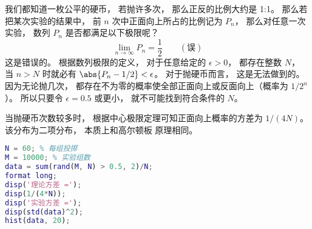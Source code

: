 
\begin{issues}
\issueDraft
\end{issues}


我们都知道一枚公平的硬币， 若抛许多次， 那么正反的比例大约是 1:1。 那么若把某次实验的结果中， 前 $n$ 次中正面向上所占的比例记为 $P_n$， 那么对任意一次实验， 数列 $P_n$ 是否都满足以下极限呢？
\begin{equation}
\lim_{n\to\infty} P_n = \frac{1}{2} \qquad (\text{误})
\end{equation}
这是错误的。 根据数列极限的定义， 对于任意给定的 $\epsilon > 0$， 都存在整数 $N$， 当 $n>N$ 时就必有 $\abs{P_n -1/2} < \epsilon$。 对于抛硬币而言， 这是无法做到的。 因为无论抛几次， 都存在不为零的概率使全部正面向上或反面向上（概率为 $1/2^n$）。 所以只要令 $\epsilon = 0.5$ 或更小， 就不可能找到符合条件的 $N$。

当抛硬币次数较多时， 根据中心极限定理可知正面向上概率的方差为 $1/(4N)$。 该分布为二项分布， 本质上和高尔顿板 原理相同。

\begin{lstlisting}[language=matlab]
N = 60; % 每组投掷
M = 10000; % 实验组数
data = sum(rand(M, N) > 0.5, 2)/N;
format long;
disp('理论方差 =');
disp(1/(4*N));
disp('实验方差 =');
disp(std(data)^2);
hist(data, 20);
\end{lstlisting}
